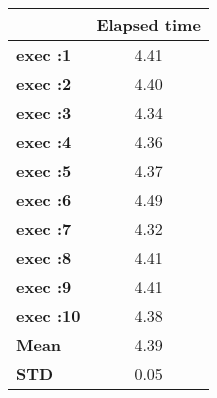 \begin{tiny}\begin{tabular}{|l|c|}
\hline
&\textbf{Elapsed time}\\\hline
\textbf{exec :1}&4.41\\\hline
\textbf{exec :2}&4.40\\\hline
\textbf{exec :3}&4.34\\\hline
\textbf{exec :4}&4.36\\\hline
\textbf{exec :5}&4.37\\\hline
\textbf{exec :6}&4.49\\\hline
\textbf{exec :7}&4.32\\\hline
\textbf{exec :8}&4.41\\\hline
\textbf{exec :9}&4.41\\\hline
\textbf{exec :10}&4.38\\\hline
\textbf{ Mean}&4.39\\\hline
\textbf{ STD}&0.05\\\hline
\end{tabular}
\end{tiny}